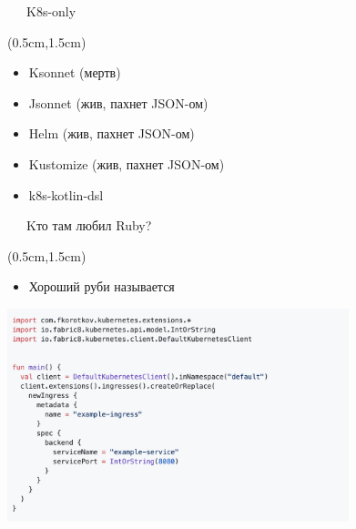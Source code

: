 \documentclass[xetex,18pt,aspectratio=43]{beamer}
\begin{document}
\begin{Large}
\begin{frame}{\ \ \ K8s-only}
\begin{textblock*}{\framewidth-0.8cm}(0.5cm,1.5cm)
\begin{itemize}
  \item Ksonnet (мертв)
  \item Jsonnet (жив, пахнет JSON-ом)
  \item Helm (жив, пахнет JSON-ом)
  \item Kustomize (жив, пахнет JSON-ом)
  \item k8s-kotlin-dsl
\end{itemize}
\end{textblock*}
\end{frame}

\begin{frame}{\ \ \ Kто там любил Ruby?}
\begin{textblock*}{\framewidth-0.8cm}(0.5cm,1.5cm)
\begin{itemize}
  \item Хороший руби называется {\color {red}{\bf Kotlin}}
\end{itemize}
\begin{minipage}{\textwidth}
  \centering
  \includegraphics[height=6.2cm]{img/kotlindsl}
\end{minipage}
\end{textblock*}
\end{frame}


\end{Large}
\end{document}
